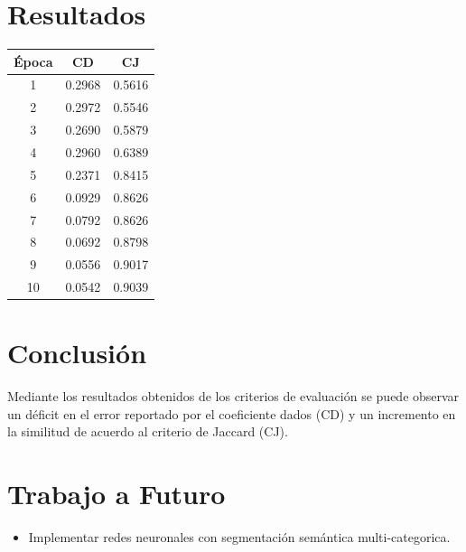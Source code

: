 \documentclass[a0,portrait]{a0poster}
\begin{document}
\begin{multicols}{3}
\section*{Resultados}
\begin{center}\vspace{1cm}
    \begin{tabular}{ccc}
    \toprule
    \textbf{Época} & \textbf{CD} & \textbf{CJ} \\
    \midrule
     1 & 0.2968 & 0.5616 \\
     2 & 0.2972 & 0.5546 \\
     3 & 0.2690 & 0.5879 \\
     4 & 0.2960 & 0.6389 \\
     5 & 0.2371 & 0.8415 \\
     6 & 0.0929 & 0.8626 \\
     7 & 0.0792 & 0.8626 \\
     8 & 0.0692 & 0.8798 \\
     9 & 0.0556 & 0.9017 \\
     10 & 0.0542 & 0.9039 \\
    \bottomrule
    \end{tabular}
\end{center}\vspace{1cm}    

\section*{Conclusión}
Mediante los resultados obtenidos de los criterios de evaluación se puede observar un déficit en el error reportado por el coeficiente dados (CD) y un incremento en la similitud de acuerdo al criterio de Jaccard (CJ).

\section*{Trabajo a Futuro}
\begin{itemize}
    \item Implementar redes neuronales con segmentación semántica multi-categorica.
\end{itemize}


\end{multicols}
\end{document}
